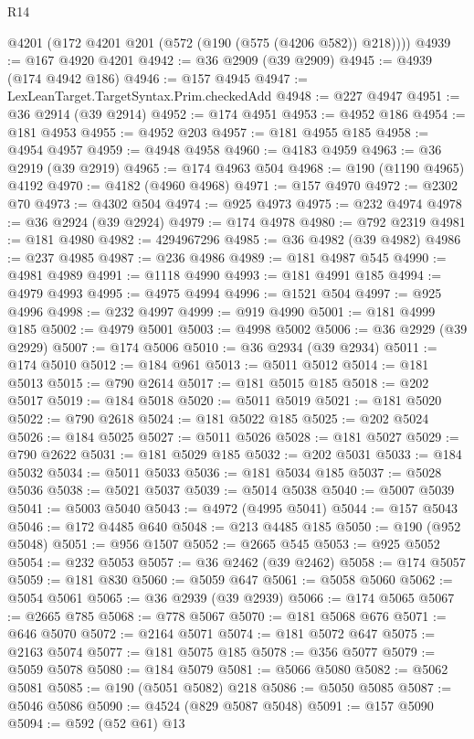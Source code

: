 \begin{lexlean}{R14}
\begin{coremodule}
      @4201
      (@172 @4201 @201 (@572 (@190 (@575 (@4206 @582)) @218))))
@4939 := @167 @4920 @4201
@4942 := @36 @2909 (@39 @2909)
@4945 := @4939 (@174 @4942 @186)
@4946 := @157 @4945
@4947 := LexLeanTarget.TargetSyntax.Prim.checkedAdd
@4948 := @227 @4947
@4951 := @36 @2914 (@39 @2914)
@4952 := @174 @4951
@4953 := @4952 @186
@4954 := @181 @4953
@4955 := @4952 @203
@4957 := @181 @4955 @185
@4958 := @4954 @4957
@4959 := @4948 @4958
@4960 := @4183 @4959
@4963 := @36 @2919 (@39 @2919)
@4965 := @174 @4963 @504
@4968 := @190 (@1190 @4965) @4192
@4970 := @4182 (@4960 @4968)
@4971 := @157 @4970
@4972 := @2302 @70
@4973 := @4302 @504
@4974 := @925 @4973
@4975 := @232 @4974
@4978 := @36 @2924 (@39 @2924)
@4979 := @174 @4978
@4980 := @792 @2319
@4981 := @181 @4980
@4982 := 4294967296
@4985 := @36 @4982 (@39 @4982)
@4986 := @237 @4985
@4987 := @236 @4986
@4989 := @181 @4987 @545
@4990 := @4981 @4989
@4991 := @1118 @4990
@4993 := @181 @4991 @185
@4994 := @4979 @4993
@4995 := @4975 @4994
@4996 := @1521 @504
@4997 := @925 @4996
@4998 := @232 @4997
@4999 := @919 @4990
@5001 := @181 @4999 @185
@5002 := @4979 @5001
@5003 := @4998 @5002
@5006 := @36 @2929 (@39 @2929)
@5007 := @174 @5006
@5010 := @36 @2934 (@39 @2934)
@5011 := @174 @5010
@5012 := @184 @961
@5013 := @5011 @5012
@5014 := @181 @5013
@5015 := @790 @2614
@5017 := @181 @5015 @185
@5018 := @202 @5017
@5019 := @184 @5018
@5020 := @5011 @5019
@5021 := @181 @5020
@5022 := @790 @2618
@5024 := @181 @5022 @185
@5025 := @202 @5024
@5026 := @184 @5025
@5027 := @5011 @5026
@5028 := @181 @5027
@5029 := @790 @2622
@5031 := @181 @5029 @185
@5032 := @202 @5031
@5033 := @184 @5032
@5034 := @5011 @5033
@5036 := @181 @5034 @185
@5037 := @5028 @5036
@5038 := @5021 @5037
@5039 := @5014 @5038
@5040 := @5007 @5039
@5041 := @5003 @5040
@5043 := @4972 (@4995 @5041)
@5044 := @157 @5043
@5046 := @172 @4485 @640
@5048 := @213 @4485 @185
@5050 := @190 (@952 @5048)
@5051 := @956 @1507
@5052 := @2665 @545
@5053 := @925 @5052
@5054 := @232 @5053
@5057 := @36 @2462 (@39 @2462)
@5058 := @174 @5057
@5059 := @181 @830
@5060 := @5059 @647
@5061 := @5058 @5060
@5062 := @5054 @5061
@5065 := @36 @2939 (@39 @2939)
@5066 := @174 @5065
@5067 := @2665 @785
@5068 := @778 @5067
@5070 := @181 @5068 @676
@5071 := @646 @5070
@5072 := @2164 @5071
@5074 := @181 @5072 @647
@5075 := @2163 @5074
@5077 := @181 @5075 @185
@5078 := @356 @5077
@5079 := @5059 @5078
@5080 := @184 @5079
@5081 := @5066 @5080
@5082 := @5062 @5081
@5085 := @190 (@5051 @5082) @218
@5086 := @5050 @5085
@5087 := @5046 @5086
@5090 := @4524 (@829 @5087 @5048)
@5091 := @157 @5090
@5094 := @592 (@52 @61) @13

\end{coremodule}
\end{lexlean}
